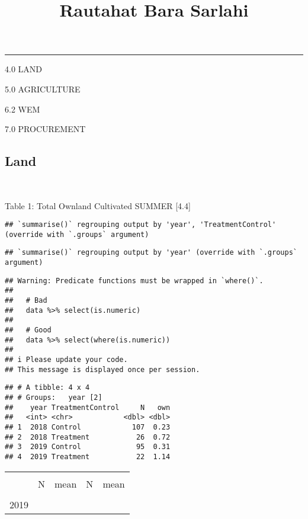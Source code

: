 \documentclass[
]{article}
\title{Rautahat Bara Sarlahi}
\author{}
\date{\vspace{-2.5em}}
\begin{document}
\maketitle

\begin{center}\rule{0.5\linewidth}{0.5pt}\end{center}

4.0 LAND

5.0 AGRICULTURE

6.2 WEM

7.0 PROCUREMENT

\hypertarget{land}{%
\subsection{Land}\label{land}}

~

Table 1: Total Ownland Cultivated SUMMER {[}4.4{]}

\begin{verbatim}
## `summarise()` regrouping output by 'year', 'TreatmentControl' (override with `.groups` argument)
\end{verbatim}

\begin{verbatim}
## `summarise()` regrouping output by 'year' (override with `.groups` argument)
\end{verbatim}

\begin{verbatim}
## Warning: Predicate functions must be wrapped in `where()`.
## 
##   # Bad
##   data %>% select(is.numeric)
## 
##   # Good
##   data %>% select(where(is.numeric))
## 
## i Please update your code.
## This message is displayed once per session.
\end{verbatim}

\begin{verbatim}
## # A tibble: 4 x 4
## # Groups:   year [2]
##    year TreatmentControl     N   own
##   <int> <chr>            <dbl> <dbl>
## 1  2018 Control            107  0.23
## 2  2018 Treatment           26  0.72
## 3  2019 Control             95  0.31
## 4  2019 Treatment           22  1.14
\end{verbatim}

\begin{tabular}{>{\raggedright\arraybackslash}p{1.5cm}>{\centering\arraybackslash}p{1.5cm}>{\centering\arraybackslash}p{1.5cm}|>{\centering\arraybackslash}p{1.5cm}>{\centering\arraybackslash}p{1.5cm}}
\toprule
\multicolumn{1}{c}{ } & \multicolumn{2}{c}{Control} & \multicolumn{2}{c}{Treatment} \\
\cmidrule(l{3pt}r{3pt}){2-3} \cmidrule(l{3pt}r{3pt}){4-5}
\begingroup\fontsize{8}{10}\selectfont  \endgroup & \begingroup\fontsize{8}{10}\selectfont N\endgroup & \begingroup\fontsize{8}{10}\selectfont mean\endgroup & \begingroup\fontsize{8}{10}\selectfont N\endgroup & \begingroup\fontsize{8}{10}\selectfont mean\endgroup\\
\midrule
2018 & 107 & 0.23 & 26 & 0.72\\
\rowcolor{gray!6}  2019 & 95 & 0.31 & 22 & 1.14\\
\bottomrule
\end{tabular}
\end{document}
